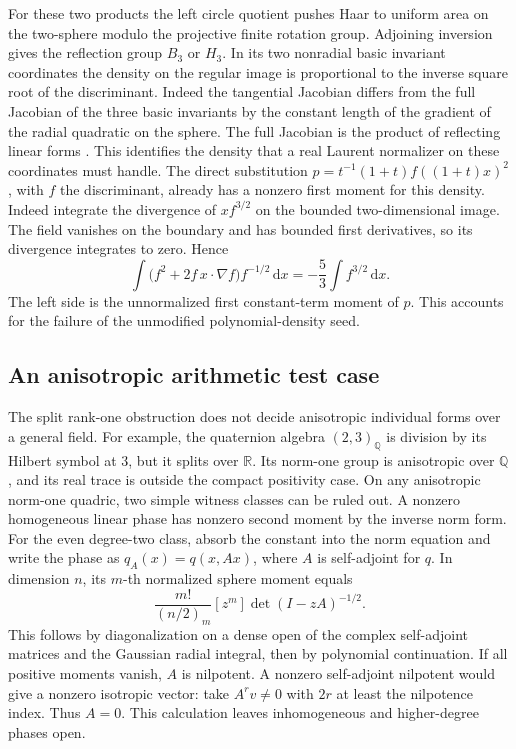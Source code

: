 \documentclass[11pt]{article}
\newcommand{\RR}{\mathbb R}
\newcommand{\QQ}{\mathbb Q}
\newcommand{\dd}{\,\mathrm d}
\begin{document}
For these two products the left circle quotient pushes Haar to
uniform area on the two-sphere modulo the projective finite rotation
group. Adjoining inversion gives the reflection group \(B_3\) or
\(H_3\). In its two nonradial basic invariant coordinates the density
on the regular image is proportional to the inverse square root of
the discriminant. Indeed the tangential Jacobian differs from the
full Jacobian of the three basic invariants by the constant
length of the gradient of the radial quadratic on the sphere.
The full Jacobian is the product of reflecting linear forms
\cite{Chevalley,Steinberg}. This identifies the density that a
real Laurent normalizer on these coordinates must handle. The direct
substitution \(p=t^{-1}(1+t)f((1+t)x)^2\), with \(f\) the discriminant,
already has a nonzero first moment for this density. Indeed integrate
the divergence of \(x f^{3/2}\) on the bounded two-dimensional
image. The field vanishes on the boundary and has bounded first
derivatives, so its divergence integrates to zero. Hence
\[
 \int \bigl(f^2+2f\,x\cdot\nabla f\bigr)f^{-1/2}\dd x
   =-\frac53\int f^{3/2}\dd x .
\]
The left side is the unnormalized first constant-term moment of \(p\).
This accounts for the failure of the unmodified polynomial-density
seed.

\subsection*{An anisotropic arithmetic test case}

The split rank-one obstruction does not decide anisotropic
individual forms over a general field. For example, the quaternion
algebra \((2,3)_{\QQ}\) is division by its Hilbert symbol at \(3\),
but it splits over \(\RR\). Its norm-one group is anisotropic over
\(\QQ\), and its real trace is outside the compact positivity
case. On any anisotropic norm-one quadric, two simple witness
classes can be ruled out. A nonzero homogeneous linear phase
has nonzero second moment by the inverse norm form. For the even
degree-two class, absorb the constant into the norm equation and
write the phase as \(q_A(x)=q(x,Ax)\), where \(A\) is self-adjoint
for \(q\). In dimension \(n\), its \(m\)-th normalized sphere
moment equals
\[
 \frac{m!}{(n/2)_m}[z^m]\det(I-zA)^{-1/2}.
\]
This follows by diagonalization on a dense open of the complex
self-adjoint matrices and the Gaussian radial integral, then by
polynomial continuation. If all positive moments vanish, \(A\)
is nilpotent. A nonzero self-adjoint nilpotent would give a
nonzero isotropic vector: take \(A^r v\ne0\) with \(2r\) at least
the nilpotence index. Thus \(A=0\). This calculation leaves
inhomogeneous and higher-degree phases open.
\end{document}
